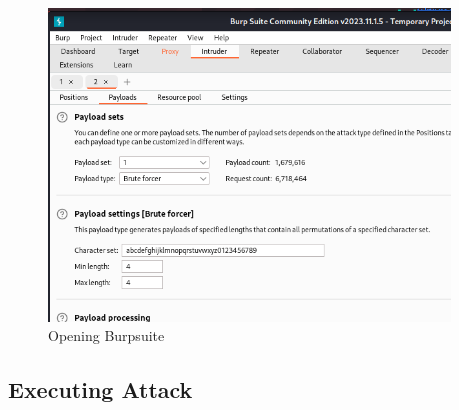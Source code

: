 \documentclass[11pt]{article}
\begin{document}

\begin{figure}[H]
    \centering
    \includegraphics[width=0.95\textwidth]{burpsuite (8).png}
    \caption{Opening Burpsuite}
    \label{fig:1}
\end{figure}
\subsection{Executing Attack}



\end{document}
